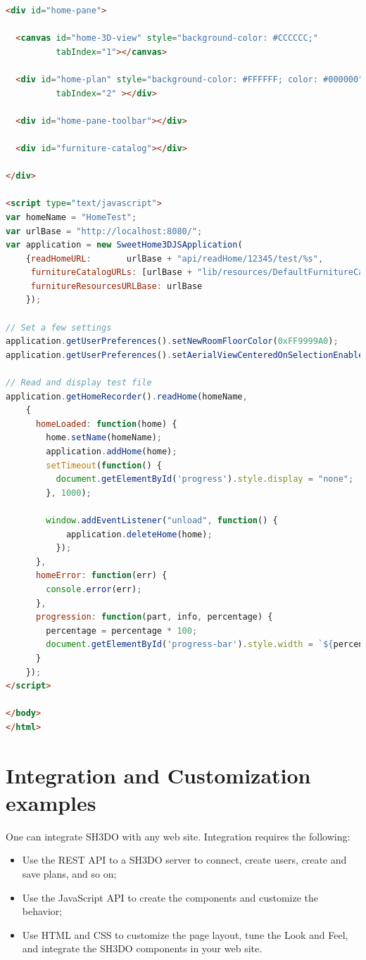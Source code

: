 \documentclass[a4paper]{report}
\begin{document}
\begin{lstlisting}[language=html,caption={Basic example},captionpos=b,label={lst:basic-example}]
<div id="home-pane">

  <canvas id="home-3D-view" style="background-color: #CCCCCC;" 
          tabIndex="1"></canvas>

  <div id="home-plan" style="background-color: #FFFFFF; color: #000000"         
          tabIndex="2" ></div>

  <div id="home-pane-toolbar"></div>

  <div id="furniture-catalog"></div>

</div>

<script type="text/javascript">
var homeName = "HomeTest";
var urlBase = "http://localhost:8080/";
var application = new SweetHome3DJSApplication(
    {readHomeURL:       urlBase + "api/readHome/12345/test/%s",
     furnitureCatalogURLs: [urlBase + "lib/resources/DefaultFurnitureCatalog.json"],
     furnitureResourcesURLBase: urlBase
    });

// Set a few settings
application.getUserPreferences().setNewRoomFloorColor(0xFF9999A0);
application.getUserPreferences().setAerialViewCenteredOnSelectionEnabled(true);

// Read and display test file 
application.getHomeRecorder().readHome(homeName, 
    {
      homeLoaded: function(home) {
        home.setName(homeName);
        application.addHome(home);
        setTimeout(function() {
          document.getElementById('progress').style.display = "none";
        }, 1000);
        
        window.addEventListener("unload", function() {
            application.deleteHome(home);
          });
      },
      homeError: function(err) {
        console.error(err);
      },
      progression: function(part, info, percentage) {
        percentage = percentage * 100;
        document.getElementById('progress-bar').style.width = `${percentage}%`;
      }
    });
</script>

</body>
</html>
\end{lstlisting}

\chapter{Integration and Customization examples} 

One can integrate SH3DO with any web site. Integration requires the following:

\begin{itemize}
\item Use the REST API to a SH3DO server to connect, create users, create and save plans, and so on;
\item Use the JavaScript API to create the components and customize the behavior;
\item Use HTML and CSS to customize the page layout, tune the Look and Feel, and integrate the SH3DO components in your web site.
\end{itemize}
\end{document}
